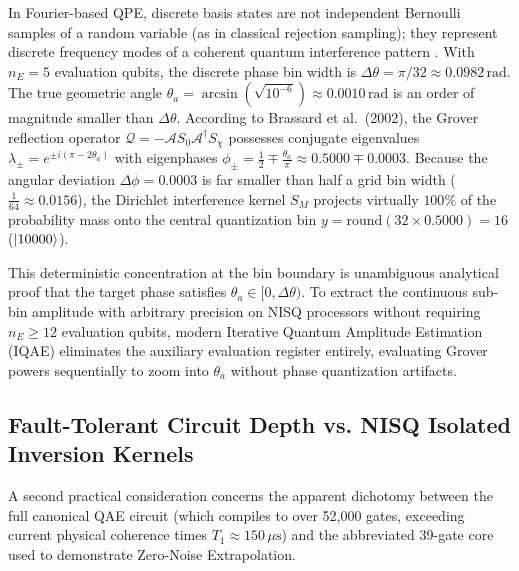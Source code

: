 In Fourier-based QPE, discrete basis states are not independent Bernoulli samples of a random variable (as in classical rejection sampling); they represent discrete frequency modes of a coherent quantum interference pattern \cite{brassard2002}. With $n_E = 5$ evaluation qubits, the discrete phase bin width is $\Delta\theta = \pi/32 \approx 0.0982\,\mathrm{rad}$. The true geometric angle $\theta_a = \arcsin(\sqrt{10^{-6}}) \approx 0.0010\,\mathrm{rad}$ is an order of magnitude smaller than $\Delta\theta$. According to Brassard et al.~(2002), the Grover reflection operator $\mathcal{Q} = -\mathcal{A} S_0 \mathcal{A}^\dagger S_\chi$ possesses conjugate eigenvalues $\lambda_\pm = e^{\pm i(\pi - 2\theta_a)}$ with eigenphases $\phi_\pm = \frac{1}{2} \mp \frac{\theta_a}{\pi} \approx 0.5000 \mp 0.0003$. Because the angular deviation $\Delta\phi = 0.0003$ is far smaller than half a grid bin width ($\frac{1}{64} \approx 0.0156$), the Dirichlet interference kernel $S_M$ projects virtually $100\%$ of the probability mass onto the central quantization bin $y = \mathrm{round}(32 \times 0.5000) = 16$ ($\left|10000\right\rangle$).

This deterministic concentration at the bin boundary is unambiguous analytical proof that the target phase satisfies $\theta_a \in [0, \Delta\theta)$. To extract the continuous sub-bin amplitude with arbitrary precision on NISQ processors without requiring $n_E \ge 12$ evaluation qubits, modern Iterative Quantum Amplitude Estimation (IQAE) \cite{grinko2021} eliminates the auxiliary evaluation register entirely, evaluating Grover powers sequentially to zoom into $\theta_a$ without phase quantization artifacts.

\subsection{Fault-Tolerant Circuit Depth vs. NISQ Isolated Inversion Kernels}
A second practical consideration concerns the apparent dichotomy between the full canonical QAE circuit (which compiles to over 52,000 gates, exceeding current physical coherence times $T_1 \approx 150\,\mu\mathrm{s}$) and the abbreviated 39-gate core used to demonstrate Zero-Noise Extrapolation.

